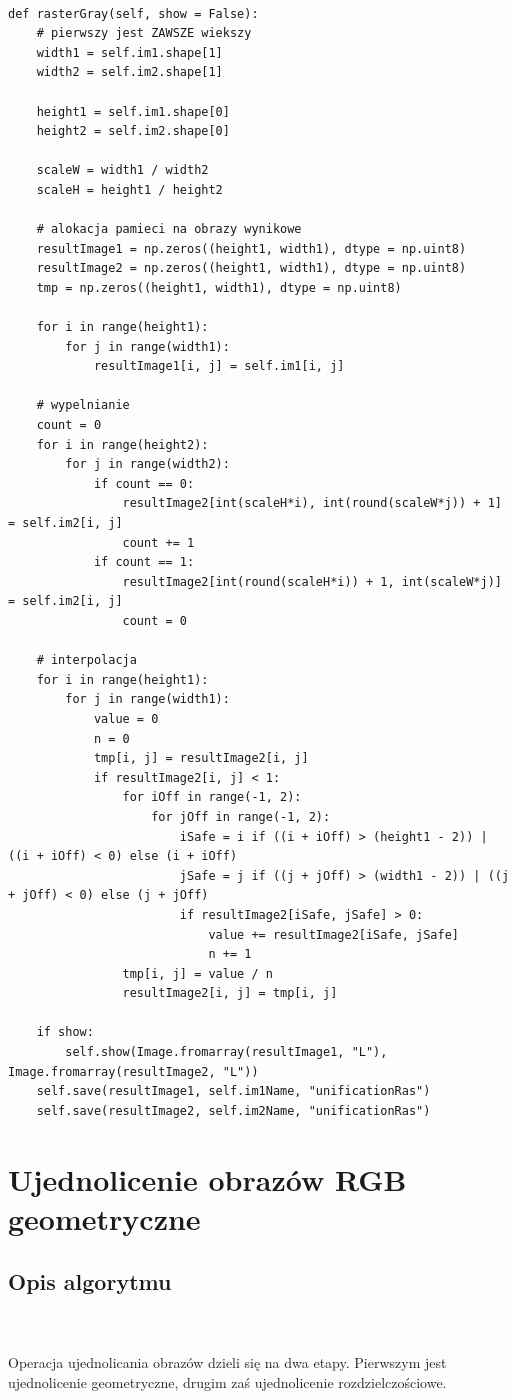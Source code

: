 \documentclass[final,a4paper,openany,12pt]{mwbk}
\begin{document}
\begin{lstlisting}[caption=Rastrowe ujednolicanie obrazów szarych]

def rasterGray(self, show = False):
	# pierwszy jest ZAWSZE wiekszy
	width1 = self.im1.shape[1]
	width2 = self.im2.shape[1]
	
	height1 = self.im1.shape[0]
	height2 = self.im2.shape[0]
	
	scaleW = width1 / width2
	scaleH = height1 / height2
	
	# alokacja pamieci na obrazy wynikowe
	resultImage1 = np.zeros((height1, width1), dtype = np.uint8)
	resultImage2 = np.zeros((height1, width1), dtype = np.uint8)
	tmp = np.zeros((height1, width1), dtype = np.uint8)
	
	for i in range(height1):
		for j in range(width1):
			resultImage1[i, j] = self.im1[i, j]
	
	# wypelnianie
	count = 0
	for i in range(height2):
		for j in range(width2):
			if count == 0:
				resultImage2[int(scaleH*i), int(round(scaleW*j)) + 1] = self.im2[i, j]
				count += 1
			if count == 1:
				resultImage2[int(round(scaleH*i)) + 1, int(scaleW*j)] = self.im2[i, j]
				count = 0
	
	# interpolacja
	for i in range(height1):
		for j in range(width1):
			value = 0
			n = 0
			tmp[i, j] = resultImage2[i, j]
			if resultImage2[i, j] < 1:
				for iOff in range(-1, 2):
					for jOff in range(-1, 2):
						iSafe = i if ((i + iOff) > (height1 - 2)) | ((i + iOff) < 0) else (i + iOff)
						jSafe = j if ((j + jOff) > (width1 - 2)) | ((j + jOff) < 0) else (j + jOff)
						if resultImage2[iSafe, jSafe] > 0:
							value += resultImage2[iSafe, jSafe]
							n += 1
				tmp[i, j] = value / n
				resultImage2[i, j] = tmp[i, j]
	
	if show:
		self.show(Image.fromarray(resultImage1, "L"), Image.fromarray(resultImage2, "L"))
	self.save(resultImage1, self.im1Name, "unificationRas")
	self.save(resultImage2, self.im2Name, "unificationRas")

\end{lstlisting}

\newpage







\section{Ujednolicenie obrazów RGB geometryczne}
\subsection*{Opis algorytmu}
\hfill
\\\\
\indent 
Operacja ujednolicania obrazów dzieli się na dwa etapy. Pierwszym jest ujednolicenie geometryczne, drugim zaś ujednolicenie rozdzielczościowe.
\end{document}
